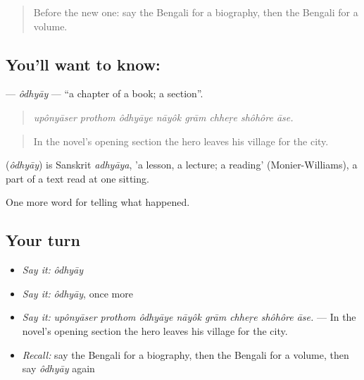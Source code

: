 \label{lesson:BN-C327-odhyay}



\begin{quote}
Before the new one: say the Bengali for a biography, then the Bengali for a volume.
\end{quote}

\subsection*{You'll want to know: }
\textbf{} — \emph{ôdhyāy} — \textquotedblleft{}a chapter of a book; a section\textquotedblright{}.

\begin{quote}
       
\end{quote}

\begin{quote}
\emph{upônyāser prothom ôdhyāye nāyôk grām chheṛe shôhôre āse.}
\end{quote}

\begin{quote}
In the novel's opening section the hero leaves his village for the city.
\end{quote}

\begin{cousinweb}
\textbf{} (\emph{ôdhyāy}) is Sanskrit \emph{adhyāya}, 'a lesson, a lecture; a reading' (Monier-Williams), a part of a text read at one sitting.
\end{cousinweb}

\begin{grammarlens}[title={What you've built}]
One more word for telling what happened.
\end{grammarlens}

\subsection*{Your turn}
\begin{itemize}
\raggedright
  \item \emph{Say it:} \emph{ôdhyāy}
  \item \emph{Say it:} \emph{ôdhyāy}, once more
  \item \emph{Say it:} \emph{upônyāser prothom ôdhyāye nāyôk grām chheṛe shôhôre āse.} — In the novel's opening section the hero leaves his village for the city.
  \item \emph{Recall:} say the Bengali for a biography, then the Bengali for a volume, then say \emph{ôdhyāy} again
\end{itemize}

